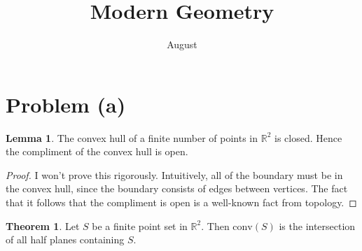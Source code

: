 \documentclass[12pt]{article}
\title{Modern Geometry}
\author{August}
\newcommand{\R}{\mathbb{R}}
\newcommand{\conv}[1]{\mbox{conv}(#1)}
\theoremstyle{definition}
\newtheorem{lemma}{Lemma}
\newtheorem{theorem}{Theorem}
\begin{document}
\maketitle



\section{Problem (a)}

\begin{lemma}
The convex hull of a finite number of points in $\R^2$ is closed. Hence the compliment of the convex hull is open.
\end{lemma}

\begin{proof}
I won't prove this rigorously. Intuitively, all of the boundary must be in the convex hull, since the boundary consists of edges between vertices. The fact that it follows that the compliment is open is a well-known fact from topology. 
\end{proof}


\begin{theorem}
Let $S$ be a finite point set in $\R^2$. Then $\conv{S}$ is the intersection of all half planes containing $S$.
\end{theorem}
\end{document}
